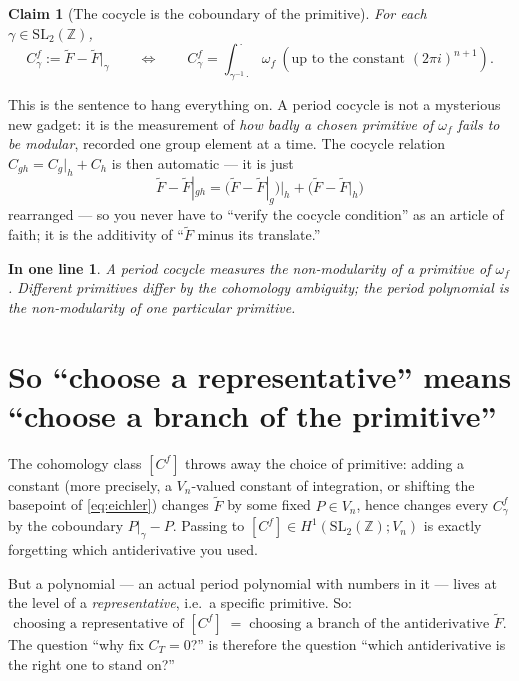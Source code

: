 \documentclass[11pt]{article}
\newcommand{\ZZ}{\mathbb{Z}}
\newcommand{\SLZ}{\mathrm{SL}_2(\ZZ)}
\newcommand{\Vn}{V_n}
\newcommand{\Eich}{\widetilde{F}}
\newtheorem*{claim}{Claim}
\newtheorem*{slogan}{In one line}
\begin{document}
\begin{claim}[The cocycle is the coboundary of the primitive]
For each $\gamma \in \SLZ$,
\begin{equation}\label{eq:C-as-coboundary-of-F}
  C^f_\gamma := \Eich - \Eich\big|_\gamma
  \qquad\Longleftrightarrow\qquad
  C^f_\gamma = \int_{\gamma^{-1}\cdot}^{\,\cdot} \omega_f \ (\text{up to the constant }(2\pi i)^{n+1}).
\end{equation}
\end{claim}

\noindent
This is the sentence to hang everything on. A period cocycle is not a
mysterious new gadget: it is the measurement of \emph{how badly a chosen
primitive of $\omega_f$ fails to be modular}, recorded one group element
at a time. The cocycle relation
$C_{gh} = C_g|_h + C_h$ is then automatic --- it is just
\[
  \Eich - \Eich|_{gh}
  = \bigl(\Eich - \Eich|_g\bigr)\big|_h + \bigl(\Eich - \Eich|_h\bigr)
\]
rearranged --- so you never have to ``verify the cocycle condition'' as
an article of faith; it is the additivity of ``$\Eich$ minus its
translate.''

\begin{slogan}
A period cocycle measures the non-modularity of a primitive of
$\omega_f$. Different primitives differ by the cohomology ambiguity; the
period polynomial is the non-modularity of \emph{one particular}
primitive.
\end{slogan}

\section{So ``choose a representative'' means ``choose a branch of the primitive''}

The cohomology class $[C^f]$ throws away the choice of primitive: adding
a constant (more precisely, a $\Vn$-valued constant of integration, or
shifting the basepoint of \eqref{eq:eichler}) changes $\Eich$ by some
fixed $P \in \Vn$, hence changes every $C^f_\gamma$ by the coboundary
$P|_\gamma - P$. Passing to $[C^f] \in H^1(\SLZ;\Vn)$ is exactly
forgetting which antiderivative you used.

But a polynomial --- an actual period polynomial with numbers in it ---
lives at the level of a \emph{representative}, i.e.\ a specific
primitive. So:
\[
  \boxed{\ \text{choosing a representative of } [C^f]
  \;=\; \text{choosing a branch of the antiderivative } \Eich.\ }
\]
The question ``why fix $C_T = 0$?'' is therefore the question ``which
antiderivative is the right one to stand on?''
\end{document}
